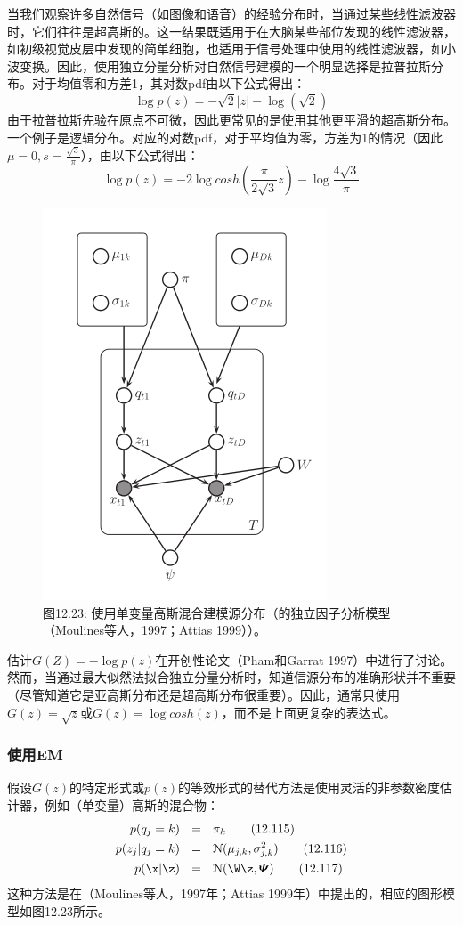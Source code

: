 \documentclass[a4paper]{article}
\begin{document}
当我们观察许多自然信号（如图像和语音）的经验分布时，当通过某些线性滤波器时，它们往往是超高斯的。这一结果既适用于在大脑某些部位发现的线性滤波器，如初级视觉皮层中发现的简单细胞，也适用于信号处理中使用的线性滤波器，如小波变换。因此，使用独立分量分析对自然信号建模的一个明显选择是拉普拉斯分布。对于均值零和方差1，其对数pdf由以下公式得出： 
\begin{equation}
	\log p(z)=-\sqrt{2}|z|-\log (\sqrt{2})\tag{12.113}
\end{equation}
由于拉普拉斯先验在原点不可微，因此更常见的是使用其他更平滑的超高斯分布。一个例子是逻辑分布。对应的对数pdf，对于平均值为零，方差为1的情况（因此$\mu=0,s=\frac{\sqrt{3}}{\pi}$），由以下公式得出： 
\begin{equation}
	\log p(z)=-2\log cosh(\frac{\pi}{2\sqrt{3}}z)-\log \frac{4\sqrt{3}}{\pi}\tag{12.114}
\end{equation}
\begin{figure}[h]
	\centering
	\includegraphics[width=0.4\linewidth]{fig/figure23}
	\caption*{图12.23: 使用单变量高斯混合建模源分布（的独立因子分析模型（Moulines等人，1997；Attias 1999））。 }
\end{figure}

估计$G(Z)=-\log p(z)$在开创性论文（Pham和Garrat 1997）中进行了讨论。然而，当通过最大似然法拟合独立分量分析时，知道信源分布的准确形状并不重要（尽管知道它是亚高斯分布还是超高斯分布很重要）。因此，通常只使用$G(z)=\sqrt{z}$或$G(z)=\log cosh(z)$，而不是上面更复杂的表达式。 
\subsubsection{使用EM }
假设$G(z)$的特定形式或$p(z)$的等效形式的替代方法是使用灵活的非参数密度估计器，例如（单变量）高斯的混合物： 
\begin{align}
	p(q_j=k)\ \ &=\ \ \pi_k\tag{12.115}\\
	p(z_j|q_j=k)\ \ &=\ \ \mathcal{N}(\mu_{j,k},\sigma_{j,k}^2)\tag{12.116}\\
	p(\x|\z)\ \ &=\ \ \mathcal{N}(\W\z,\boldsymbol{\varPsi})\tag{12.117}
\end{align}
这种方法是在（Moulines等人，1997年；Attias 1999年）中提出的，相应的图形模型如图12.23所示。 
\end{document}
